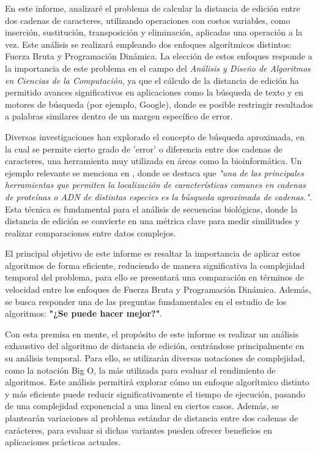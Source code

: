 En este informe, analizaré el problema de calcular la distancia de edición entre dos cadenas de caracteres, utilizando operaciones con costos variables, como inserción, sustitución, transposición y eliminación, aplicadas una operación a la vez. Este análisis se realizará empleando dos enfoques algorítmicos distintos: Fuerza Bruta y Programación Dinámica. La elección de estos enfoques responde a la importancia de este problema en el campo del \textit{Análisis y Diseño de Algoritmos en Ciencias de la Computación}, ya que el cálculo de la distancia de edición ha permitido avances significativos en aplicaciones como la búsqueda de texto y en motores de búsqueda (por ejemplo, Google), donde es posible restringir resultados a palabras similares dentro de un margen específico de error.

Diversas investigaciones han explorado el concepto de búsqueda aproximada, en la cual se permite cierto grado de 'error' o diferencia entre dos cadenas de caracteres, una herramienta muy utilizada en áreas como la bioinformática. Un ejemplo relevante se menciona en , donde se destaca que \textit{"una de las principales herramientas que permiten la localización de características comunes en cadenas de proteínas o ADN de distintas especies es la búsqueda aproximada de cadenas."}. Esta técnica es fundamental para el análisis de secuencias biológicas, donde la distancia de edición se convierte en una métrica clave para medir similitudes y realizar comparaciones entre datos complejos.

El principal objetivo de este informe es resaltar la importancia de aplicar estos algoritmos de forma eficiente, reduciendo de manera significativa la complejidad temporal del problema, para ello se presentará una comparación en términos de velocidad entre los enfoques de Fuerza Bruta y Programación Dinámica. Además, se busca responder una de las preguntas fundamentales en el estudio de los algoritmos: \textbf{"¿Se puede hacer mejor?"}.

Con esta premisa en mente, el propósito de este informe es realizar un análisis exhaustivo del algoritmo de distancia de edición, centrándose principalmente en su análisis temporal. Para ello, se utilizarán diversas notaciones de complejidad, como la notación Big O, la más utilizada para evaluar el rendimiento de algoritmos. Este análisis permitirá explorar cómo un enfoque algorítmico distinto y más eficiente puede reducir significativamente el tiempo de ejecución, pasando de una complejidad exponencial a una lineal en ciertos casos. Además, se plantearán variaciones al problema estándar de distancia entre dos cadenas de carácteres, para evaluar si dichas variantes pueden ofrecer beneficios en aplicaciones prácticas actuales.